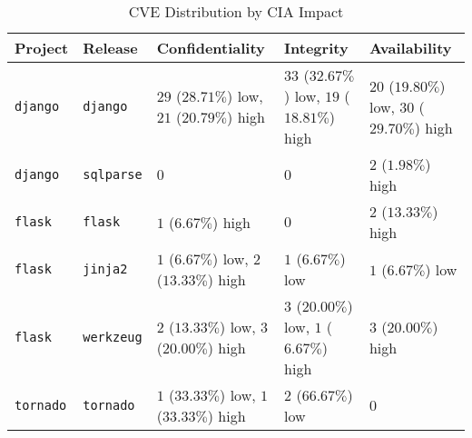 \begin{table}
\caption{CVE Distribution by CIA Impact}
\label{tab:cve-cia-distribution}
\begin{tabular}{lllll}
\toprule
Project & Release & Confidentiality & Integrity & Availability \\
\midrule
\texttt{django} & \texttt{django} & $29$ ($28.71\%$) low, $21$ ($20.79\%$) high & $33$ ($32.67\%$) low, $19$ ($18.81\%$) high & $20$ ($19.80\%$) low, $30$ ($29.70\%$) high \\
\texttt{django} & \texttt{sqlparse} & $0$ & $0$ & $2$ ($1.98\%$) high \\
\texttt{flask} & \texttt{flask} & $1$ ($6.67\%$) high & $0$ & $2$ ($13.33\%$) high \\
\texttt{flask} & \texttt{jinja2} & $1$ ($6.67\%$) low, $2$ ($13.33\%$) high & $1$ ($6.67\%$) low & $1$ ($6.67\%$) low \\
\texttt{flask} & \texttt{werkzeug} & $2$ ($13.33\%$) low, $3$ ($20.00\%$) high & $3$ ($20.00\%$) low, $1$ ($6.67\%$) high & $3$ ($20.00\%$) high \\
\texttt{tornado} & \texttt{tornado} & $1$ ($33.33\%$) low, $1$ ($33.33\%$) high & $2$ ($66.67\%$) low & $0$ \\
\bottomrule
\end{tabular}
\end{table}
